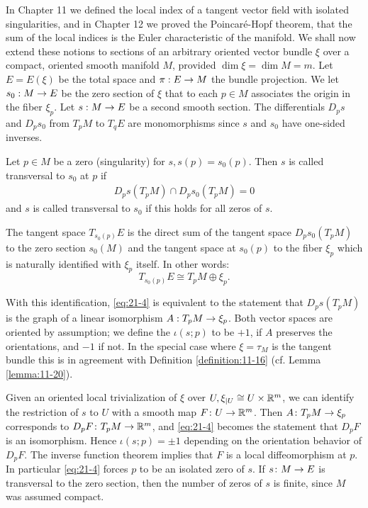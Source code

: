 In Chapter 11 we defined the local index of a tangent vector field with isolated singularities, and in Chapter 12 
we proved the Poincaré-Hopf theorem, that the sum of the local indices is the Euler characteristic of the 
manifold. We shall now extend these notions to sections of an arbitrary oriented vector bundle $\xi$ over a 
compact, oriented smooth manifold $M$, provided $\dim \xi  = \dim M = m$. Let $E = E( \xi )$ be the total 
space and $\pi  : E \rightarrow  M$ the bundle projection. We let ${s}_{0} : M \rightarrow  E$ be the zero section of $\xi$ 
that to each $p \in  M$ associates the origin in the fiber ${\xi }_{p}$. Let $s : M \rightarrow  E$ be a second smooth 
section. The differentials ${D}_{p}s$ and ${D}_{p}{s}_{0}$ from ${T}_{p}M$ to ${T}_{q}E$ are monomorphisms 
since $s$ and ${s}_{0}$ have one-sided inverses.

\begin{definition}\label{definition:21-8}
  Let $p \in  M$ be a zero (singularity) for $s,s( p)  = {s}_{0}( p)$. Then $s$ is called transversal to ${s}_{0}$ at $p$ if
  \begin{align}\label{eq:21-4}
    {D}_{p}s( {{T}_{p}M})  \cap  {D}_{p}{s}_{0}( {{T}_{p}M})  = 0
  \end{align}
  and $s$ is called transversal to ${s}_{0}$ if this holds for all zeros of $s$.
\end{definition}

The tangent space ${T}_{{s}_{0}( p) }E$ is the direct sum of the tangent space ${D}_{p}{s}_{0}( {{T}_{p}M})$ to 
the zero section ${s}_{0}( M)$ and the tangent space at ${s}_{0}( p)$ to the fiber ${\xi }_{p}$ which is naturally 
identified with ${\xi }_{p}$ itself. In other words:
\[
  {T}_{{s}_{0}( p) }E \cong  {T}_{p}M \oplus  {\xi }_{p}.
\]

With this identification, \eqref{eq:21-4} is equivalent to the statement that ${D}_{p}s( {{T}_{p}M})$ is the graph of 
a linear isomorphism $A : {T}_{p}M \rightarrow  {\xi }_{p}$. Both vector spaces are oriented by assumption; we define 
the  $\iota ( {s;p})$ to be $+1$, if $A$ preserves the orientations, and $-1$ if not. In the special 
case where $\xi  = {\tau }_{M}$ is the tangent bundle this is in agreement with Definition \ref{definition:11-16} 
(cf. Lemma \ref{lemma:11-20}).

Given an oriented local trivialization of $\xi$ over $U,{\xi }_{\mid U} \cong  U \times  {{\ensuremath{\mathbb{R}}}}^{m}$, we can 
identify the restriction of $s$ to $U$ with a smooth map $F\colon U \rightarrow  {{\ensuremath{\mathbb{R}}}}^{m}$. Then $A\colon {T}_{p}M \rightarrow  {\xi }_{p}$ 
corresponds to ${D}_{p}F\colon {T}_{p}M \rightarrow  {{\ensuremath{\mathbb{R}}}}^{m}$, and \eqref{eq:21-4} becomes the statement that ${D}_{p}F$ is an isomorphism. 
Hence $\iota ( {s;p})  =  \pm  1$ depending on the orientation behavior of ${D}_{p}F$. The inverse function theorem 
implies that $F$ is a local diffeomorphism at $p$. In particular \eqref{eq:21-4} forces $p$ to be an isolated zero of $s$. 
If $s\colon M \rightarrow  E$ is transversal to the zero section, then the number of zeros of $s$ is finite, since $M$ was 
assumed compact.

